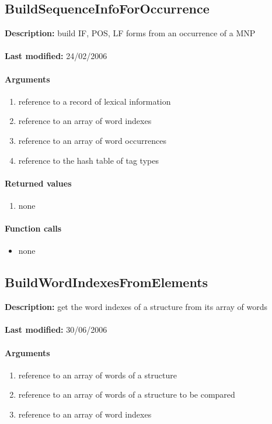 \subsection{BuildSequenceInfoForOccurrence}
\textbf{Description:} build IF, POS, LF forms from an occurrence of a MNP\\
\\\textbf{Last modified:} 24/02/2006

\paragraph{Arguments}
\begin{enumerate}
\item reference to a record of lexical information
\item reference to an array of word indexes
\item reference to an array of word occurrences
\item reference to the hash table of tag types
\end{enumerate}

\paragraph{Returned values}
\begin{enumerate}
\item none
\end{enumerate}

\paragraph{Function calls}
\begin{itemize}
\item none
\end{itemize}

\subsection{BuildWordIndexesFromElements}
\textbf{Description:} get the word indexes of a structure from its array of words\\
\\\textbf{Last modified:} 30/06/2006

\paragraph{Arguments}
\begin{enumerate}
\item reference to an array of words of a structure
\item reference to an array of words of a structure to be compared
\item reference to an array of word indexes
\end{enumerate}

